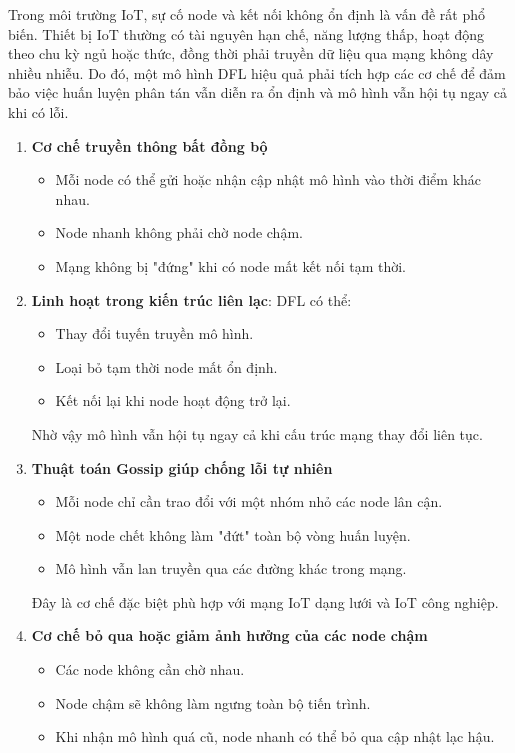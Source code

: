 \hspace{0.6cm}Trong môi trường IoT, sự cố node và kết nối không ổn định là vấn đề rất phổ biến. Thiết bị IoT thường có tài nguyên hạn chế, năng lượng thấp, hoạt động theo chu kỳ ngủ hoặc thức, đồng thời phải truyền dữ liệu qua mạng không dây nhiều nhiễu. Do đó, một mô hình DFL hiệu quả phải tích hợp các cơ chế để đảm bảo việc huấn luyện phân tán vẫn diễn ra ổn định và mô hình vẫn hội tụ ngay cả khi có lỗi.

\begin{enumerate}
    \item \textbf{Cơ chế truyền thông bất đồng bộ}
    \begin{itemize}
    \item Mỗi node có thể gửi hoặc nhận cập nhật mô hình vào thời điểm khác nhau.
    \item Node nhanh không phải chờ node chậm.
    \item Mạng không bị "đứng" khi có node mất kết nối tạm thời.
\end{itemize}
    \item \textbf{Linh hoạt trong kiến trúc liên lạc}: 
    DFL có thể:
    \begin{itemize}
    \item Thay đổi tuyến truyền mô hình.
    \item Loại bỏ tạm thời node mất ổn định.
    \item Kết nối lại khi node hoạt động trở lại.
\end{itemize}
Nhờ vậy mô hình vẫn hội tụ ngay cả khi cấu trúc mạng thay đổi liên tục.
    \item \textbf{Thuật toán Gossip giúp chống lỗi tự nhiên}
    \begin{itemize}
    \item Mỗi node chỉ cần trao đổi với một nhóm nhỏ các node lân cận.
    \item Một node chết không làm "đứt" toàn bộ vòng huấn luyện.
    \item Mô hình vẫn lan truyền qua các đường khác trong mạng.
\end{itemize}
Đây là cơ chế đặc biệt phù hợp với mạng IoT dạng lưới và IoT công nghiệp.
    \item \textbf{Cơ chế bỏ qua hoặc giảm ảnh hưởng của các node chậm}
    \begin{itemize}
    \item Các node không cần chờ nhau.
    \item Node chậm sẽ không làm ngưng toàn bộ tiến trình.
    \item Khi nhận mô hình quá cũ, node nhanh có thể bỏ qua cập nhật lạc hậu.

\end{itemize}
\end{enumerate}
